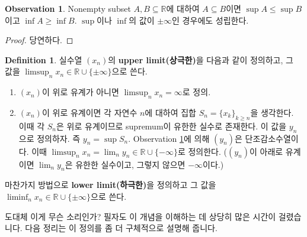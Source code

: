 \documentclass[12pt]{article}
\theoremstyle{definition}
\newtheorem{defn}[thm]{Definition}
\newtheorem{obs}[thm]{Observation}
\def\RR{\mathbb{R}}
\begin{document}
	\begin{obs} \label{obs sup}
		Nonempty subset \(A, B \subseteq \RR\)에 대하여 \(A \subseteq B\)이면 \(\sup A \le \sup B\)이고 \(\inf A \ge \inf B\). \(\sup\)이나 \(\inf\)의 값이 \(\pm\infty\)인 경우에도 성립한다.
	\end{obs}
	\begin{proof}
		당연하다.
	\end{proof}

	\begin{defn} \label{def limsup}
		실수열 \((x_n)\)의 \textbf{upper limit(상극한)}을 다음과 같이 정의하고, 그 값을 \(\limsup_n x_n \in \RR \cup \{\pm \infty\}\)으로 쓴다.
		\begin{enumerate} [label=(\alph*), leftmargin=2\parindent]
			\item
			\((x_n)\)이 위로 유계가 아니면 \(\limsup_n x_n = \infty\)로 정의.
			\item
			\((x_n)\)이 위로 유계이면 각 자연수 \(n\)에 대하여 집합 \(S_n = \{x_k\}_{k \ge n}\)을 생각한다. 이때 각 \(S_n\)은 위로 유계이므로 supremum이 유한한 실수로 존재한다. 이 값을 \(y_n\)으로 정의하자. 즉 \(y_n = \sup S_n\). Observation \ref{obs sup}에 의해 \((y_n)\)은 단조감소수열이다. 이때 \(\limsup_n x_n = \lim_n y_n \in \RR \cup \{-\infty\}\)로 정의한다. (\((y_n)\)이 아래로 유계이면 \(\lim_n y_n\)은 유한한 실수이고, 그렇지 않으면 \(-\infty\)이다.)
		\end{enumerate}
		마찬가지 방법으로 \textbf{lower limit(하극한)}을 정의하고 그 값을 \(\liminf_n x_n \in \RR \cup \{\pm \infty\}\)으로 쓴다.
	\end{defn}

도대체 이게 무슨 소리인가? 필자도 이 개념을 이해하는 데 상당히 많은 시간이 걸렸습니다. 다음 정리는 이 정의를 좀 더 구체적으로 설명해 줍니다.
\end{document}

